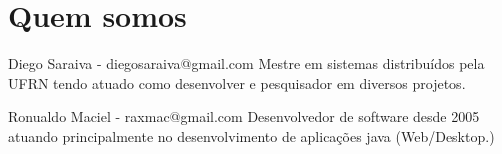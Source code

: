 \section{Quem somos}

\begin{frame}
	\begin{block}{Diego Saraiva - diegosaraiva@gmail.com}
		Mestre em sistemas distribuídos pela UFRN tendo atuado como desenvolver e
		pesquisador em diversos projetos.
	\end{block}
	
	\begin{block}{Ronualdo Maciel - raxmac@gmail.com}
		Desenvolvedor de software desde 2005 atuando principalmente no desenvolvimento
		de aplicações java (Web/Desktop.)
	\end{block}
\end{frame}